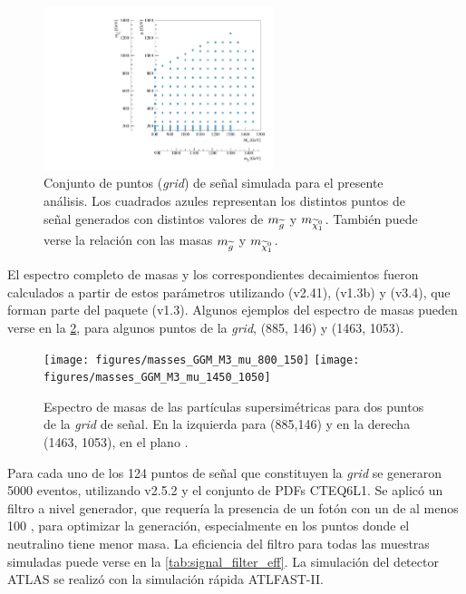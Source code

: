 \begin{figure}[!htb]
  \centering
  \includegraphics[width=0.6\textwidth]{figures/run1_grid}
  \caption{Conjunto de puntos (\emph{grid}) de señal simulada para el presente
    análisis. Los cuadrados azules representan los distintos puntos de señal
    generados con distintos valores de $m_{\widetilde{g}}$ y $m_{\ninoone}$. También
    puede verse la relación con las masas $m_{\widetilde{g}}$ y $m_{\ninoone}$.}
  \label{fig:gridpoints}
\end{figure}


El espectro completo de masas y los correspondientes decaimientos fueron
calculados a partir de estos parámetros utilizando {\suspect}
(v2.41)\cite{Djouadi2007426}, {\sdecay} (v1.3b)\cite{Muhlleitner:2004mka} y
{\hdecay} (v3.4)\cite{Djouadi:1997yw}, que forman parte del paquete {\susyhit}
(v1.3)\cite{Djouadi:2006bz}. Algunos ejemplos del espectro de masas pueden verse
en la \cref{fig:mass_spectra}, para algunos puntos de la \emph{grid}, (885, 146) y (1463, 1053).

\begin{figure}[!htb]
   \centering
   \texttt{[image: figures/masses\_GGM\_M3\_mu\_800\_150]}
   \texttt{[image: figures/masses\_GGM\_M3\_mu\_1450\_1050]}

   \caption{Espectro de masas de las partículas supersimétricas para dos puntos de la \emph{grid} de señal.
     En la izquierda para (885,146) y en la derecha (1463, 1053), en el plano \mgmn.}
   \label{fig:mass_spectra}
\end{figure}

Para cada uno de los 124 puntos de señal que constituyen la \emph{grid} se generaron
5000 eventos, utilizando {\herwigpp} v2.5.2\cite{Bahr:2008pv} y el conjunto de
PDFs CTEQ6L1\cite{Nadolsky:2008zw}. Se aplicó un filtro a nivel generador, que
requería la presencia de un fotón con un {\pt} de al menos 100 \gev, para
optimizar la generación, especialmente en los puntos donde el
neutralino tiene menor masa. La eficiencia del filtro para todas las muestras
simuladas puede verse en la \cref{tab:signal_filter_eff}. La simulación del
detector ATLAS se realizó con la simulación rápida
\textsc{ATLFAST-II}\cite{Richter-Was:683751}.



